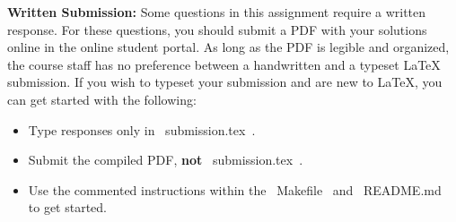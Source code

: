 {\bf Written Submission:}
Some questions in this assignment require a written response.  For these questions, you should submit a PDF
with your solutions online in the online student portal. As long as the PDF is legible and organized, the course
staff has no preference between a handwritten and a typeset \LaTeX{} submission.
If you wish to typeset your submission and are new to \LaTeX{}, you can get started with the following:
\begin{itemize}
  \item Type responses only in ~submission.tex~.
  \item Submit the compiled PDF, {\bf not} ~submission.tex~.
  \item Use the commented instructions within the ~Makefile~ and ~README.md~ to
  get started.
\end{itemize}